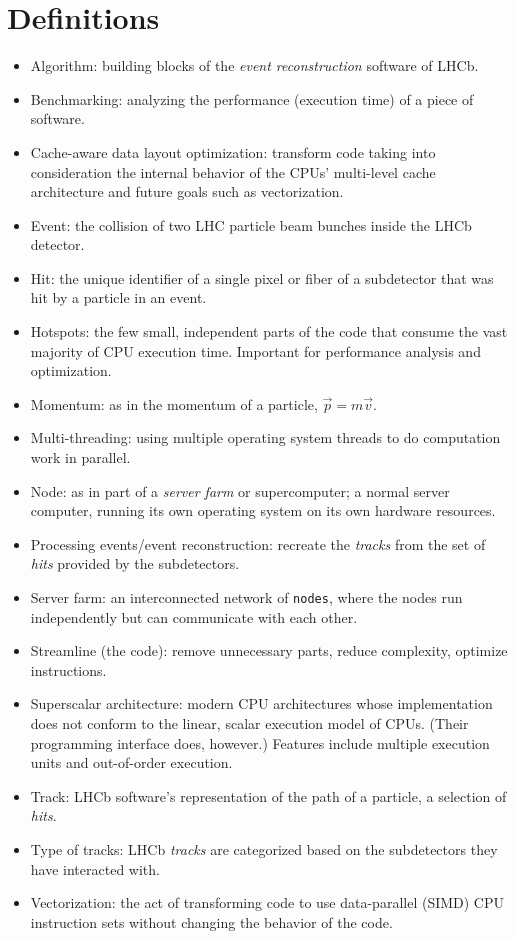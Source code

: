 \documentclass[12pt]{article}
\newcommand{\code}[1]{\texttt{#1}}
\begin{document}
\section*{Definitions}

\begin{itemize}
	\item Algorithm: building blocks of the \textit{event reconstruction} software of LHCb.
	\item Benchmarking: analyzing the performance (execution time) of a piece of software.
	\item Cache-aware data layout optimization: transform code taking into consideration the internal behavior of the CPUs' multi-level cache architecture and future goals such as vectorization.
	\item Event: the collision of two LHC particle beam bunches inside the LHCb detector.
	\item Hit: the unique identifier of a single pixel or fiber of a subdetector that was hit by a particle in an event.
	\item Hotspots: the few small, independent parts of the code that consume the vast majority of CPU execution time. Important for performance analysis and optimization.
	\item Momentum: as in the momentum of a particle, $\Vec{p}=m\Vec{v}$.
	\item Multi-threading: using multiple operating system threads to do computation work in parallel.
	\item Node: as in part of a \textit{server farm} or supercomputer; a normal server computer, running its own operating system on its own hardware resources.
	\item Processing events/event reconstruction: recreate the \textit{tracks} from the set of \textit{hits} provided by the subdetectors.
	\item Server farm: an interconnected network of \code{nodes}, where the nodes run independently but can communicate with each other.
	\item Streamline (the code): remove unnecessary parts, reduce complexity, optimize instructions.
	\item Superscalar architecture: modern CPU architectures whose implementation does not conform to the linear, scalar execution model of CPUs. (Their programming interface does, however.) Features include multiple execution units and out-of-order execution.
	\item Track: LHCb software's representation of the path of a particle, a selection of \textit{hits}.
	\item Type of tracks: LHCb \textit{tracks} are categorized based on the subdetectors they have interacted with.
	\item Vectorization: the act of transforming code to use data-parallel (SIMD) CPU instruction sets without changing the behavior of the code.
\end{itemize}
\end{document}
